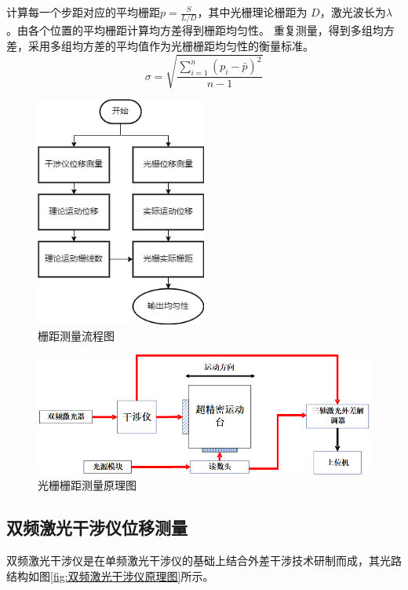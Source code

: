 \documentclass[type=master,oneside]{fduthesis}
\begin{document}
计算每一个步距对应的平均栅距\( p=\frac{S}{L/ D} \)，其中光栅理论栅距为 $ D $，激光波长为$ \lambda $。由各个位置的平均栅距计算均方差得到栅距均匀性。
重复测量，得到多组均方差，采用多组均方差的平均值作为光栅栅距均匀性的衡量标准。
\begin{equation}
  \sigma=\sqrt{\frac{\sum_{i=1}^{n}\left(p_{i}-\bar{p}\right)^{2}}{n-1}}
\end{equation}

\begin{figure}[H]
  \centering
  \includegraphics[width=0.5\textwidth]{5-fig/栅距测量流程图.png}
  \caption{栅距测量流程图}
  \label{fig:栅距测量流程图}
\end{figure}

\begin{figure}[H]
  \centering
  \includegraphics[width=1\textwidth]{5-fig/光栅栅距测量原理图.png}
  \caption{光栅栅距测量原理图}
  \label{fig:光栅栅距测量原理图}
\end{figure}


\subsection{双频激光干涉仪位移测量}
双频激光干涉仪是在单频激光干涉仪的基础上结合外差干涉技术研制而成，其光路结构如图\ref{fig:双频激光干涉仪原理图}所示。
\end{document}
